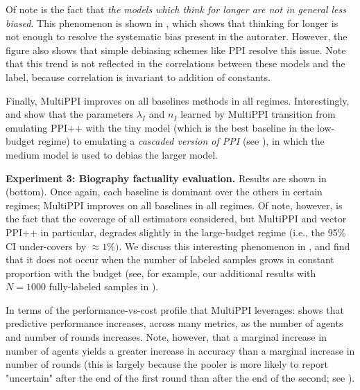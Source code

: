 \documentclass{article} %
\begin{document}
Of note is the fact that \textit{the models which think for longer are not in general less biased}. This phenomenon is shown in , which shows that thinking for longer is not enough to resolve the systematic bias present in the autorater. However, the figure also shows that simple debiasing schemes like PPI resolve this issue. Note that this trend is not reflected in the correlations between these models and the label, because correlation is invariant to addition of constants.

Finally, MultiPPI improves on all baselines methods in all regimes. Interestingly,  and  show that the parameters $\lambda_I$ and $n_I$ learned by MultiPPI transition from emulating PPI++ with the tiny model (which is the best baseline in the low-budget regime) to emulating a \textit{cascaded version of PPI} (see ), in which the medium model is used to debias the larger model.




\textbf{Experiment 3: Biography factuality evaluation.}
%     
Results are shown in  (bottom). Once again, each baseline is dominant over the others in certain regimes; MultiPPI improves on all baselines in all regimes. Of note, however, is the fact that the coverage of all estimators considered, but MultiPPI and vector PPI++ in particular, degrades slightly in the large-budget regime (i.e., the 95\% CI under-covers by $\approx 1\%)$. We discuss this interesting phenomenon in  , and find that it does not occur when the number of labeled samples grows in constant proportion with the budget (see, for example, our additional results with $N = 1000$ fully-labeled samples in ).

In terms of the performance-vs-cost profile that MultiPPI leverages:  shows that predictive performance increases, across many metrics, as the number of agents and number of rounds increases. Note, however, that a marginal increase in number of agents yields a greater increase in accuracy than a marginal increase in number of rounds (this is largely because the pooler is more likely to report "uncertain" after the end of the first round than after the end of the second; see ).
\end{document}
